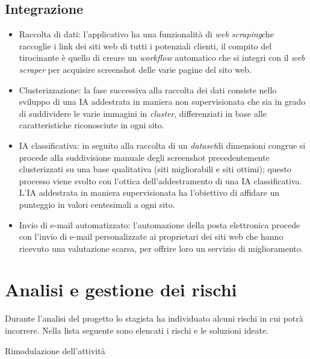 \subsection{Integrazione}
\begin{itemize}
    \item Raccolta di dati: l'applicativo ha una funzionalità di \emph{\gls{web scraping}}\glsfirstoccur che raccoglie i link dei siti web di tutti i potenziali clienti, il compito del tirocinante è quello di creare un \emph{\gls{workflow}} automatico che si integri con il \emph{web scraper} per acquisire screenshot delle varie pagine del sito web. 
    \item Clusterizzazione: la fase successiva alla raccolta dei dati consiste nello sviluppo di una IA addestrata in maniera non supervisionata che sia in grado di suddividere le varie immagini in \emph{cluster}, differenziati in base alle caratteristiche riconosciute in ogni sito. 
    \item IA classificativa: in seguito alla raccolta di un \emph{\gls{dataset}}\glsfirstoccur di dimensioni congrue si procede alla suddivisione manuale degli screenshot precedentemente clusterizzati su una base qualitativa (siti migliorabili e siti ottimi); questo processo viene svolto con l'ottica dell'addestramento di una IA classificativa.
    L'IA addestrata in maniera supervisionata ha l'obiettivo di affidare un punteggio in valori centesimali a ogni sito. 
    \item Invio di e-mail automatizzato: l'automazione della posta elettronica procede con l'invio di e-mail personalizzate ai proprietari dei siti web che hanno ricevuto una valutazione scarsa, per offrire loro un servizio di miglioramento.
\end{itemize}

\section{Analisi e gestione dei rischi}
Durante l'analisi del progetto lo stagista ha individuato alcuni rischi in cui potrà incorrere.
Nella lista seguente sono elencati i rischi e le soluzioni ideate.\\

\begin{risk}{Rimodulazione dell'attività}
    \label{risk: tempistiche ristrette} 
\end{risk}

